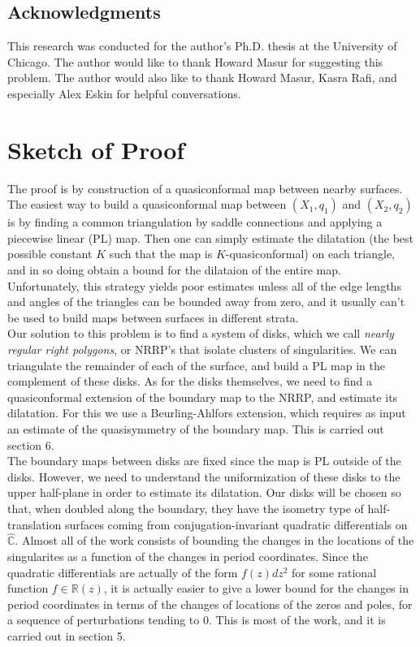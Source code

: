 \documentclass[12pt]{article}
\newcommand{\rr}{\mathbb{R}}
\newcommand{\cc}{\mathbb{C}}
\begin{document}
\subsection{Acknowledgments}

\noindent This research was conducted for the author's Ph.D. thesis at the University of Chicago. The author would like to thank Howard Masur for suggesting this problem. The author would also like to thank Howard Masur, Kasra Rafi, and especially Alex Eskin for helpful conversations.

\section{Sketch of Proof}

\noindent The proof is by construction of a quasiconformal map between nearby surfaces. The easiest way to build a quasiconformal map between $(X_1,q_1)$ and $(X_2, q_2)$ is by finding a common triangulation by saddle connections and applying a piecewise linear (PL) map. Then one can simply estimate the dilatation (the best possible constant $K$ such that the map is $K$-quasiconformal) on each triangle, and in so doing obtain a bound for the dilataion of the entire map.\\

\noindent Unfortunately, this strategy yields poor estimates unless all of the edge lengths and angles of the triangles can be bounded away from zero, and it usually can't be used to build maps between surfaces in different strata.\\

\noindent Our solution to this problem is to find a system of disks, which we call \emph{nearly regular right polygons}, or NRRP's that isolate clusters of singularities. We can triangulate the remainder of each of the surface, and build a PL map in the complement of these disks. As for the disks themselves, we need to find a quasiconformal extension of the boundary map to the NRRP, and estimate its dilatation. For this we use a Beurling-Ahlfors extension, which requires as input an estimate of the quasisymmetry of the boundary map. This is carried out section 6.\\

\noindent The boundary maps between disks are fixed since the map is PL outside of the disks. However, we need to understand the uniformization of these disks to the upper half-plane in order to estimate its dilatation. Our disks will be chosen so that, when doubled along the boundary, they have the isometry type of half-translation surfaces coming from conjugation-invariant quadratic differentials on $\hat{\cc}$. Almost all of the work consists of bounding the changes in the locations of the singularites as a function of the changes in period coordinates. Since the quadratic differentials are actually of the form $f(z)dz^2$ for some rational function $f \in \rr(z)$, it is actually easier to give a lower bound for the changes in period coordinates in terms of the changes of locations of the zeros and poles, for a sequence of perturbations tending to $0$. This is most of the work, and it is carried out in section 5.\\
\end{document}
